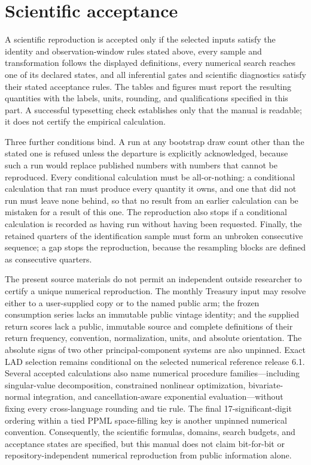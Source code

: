 \documentclass[11pt]{article}
\begin{document}
\section{Scientific acceptance}

A scientific reproduction is accepted only if the selected inputs satisfy the identity and observation-window
rules stated above, every sample and transformation follows the displayed definitions, every
numerical search reaches one of its declared states, and all inferential gates and scientific
diagnostics satisfy their stated acceptance rules. The tables and figures must report the resulting
quantities with the labels, units, rounding, and qualifications specified in this part. A successful
typesetting check establishes only that the manual is readable; it does not certify the empirical
calculation.

Three further conditions bind. A run at any bootstrap draw count other than the stated one is refused
unless the departure is explicitly acknowledged, because such a run would replace published
numbers with numbers that cannot be reproduced. Every conditional calculation must be
all-or-nothing: a conditional calculation that ran must produce every quantity it owns, and one that
did not run must leave none behind, so that no result from an earlier calculation can be mistaken
for a result of this one. The reproduction also stops if a conditional calculation is recorded as
having run without having been requested. Finally, the retained quarters of the identification sample must form an
unbroken consecutive sequence; a gap stops the reproduction, because the resampling blocks are
defined as consecutive quarters.

The present source materials do not permit an independent outside researcher to certify a unique
numerical reproduction. The monthly Treasury input may resolve either to a user-supplied copy or to
the named public arm; the frozen consumption series lacks an immutable public vintage identity;
and the supplied return scores lack a public, immutable source and complete definitions
of their return frequency, convention, normalization, units, and absolute orientation. The absolute
signs of two other principal-component systems are also unpinned. Exact LAD selection remains
conditional on the selected numerical reference release 6.1. Several accepted calculations also
name numerical procedure families---including singular-value decomposition, constrained nonlinear
optimization, bivariate-normal integration, and cancellation-aware exponential evaluation---without
fixing every cross-language rounding and tie rule. The final 17-significant-digit ordering within a
tied PPML space-filling key is another unpinned numerical convention. Consequently, the scientific formulas, domains,
search budgets, and acceptance states are specified, but this manual does not claim bit-for-bit or
repository-independent numerical reproduction from public information alone.
\end{document}
